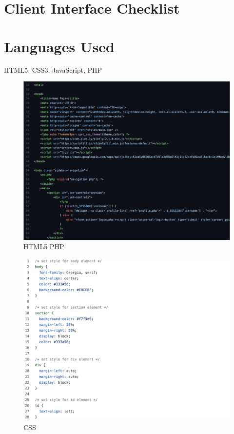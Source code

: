 \documentclass[12pt, letterpaper]{article}
\begin{document}
\newpage

\tableofcontents

\newpage

\section*{Client Interface Checklist}

\section{Languages Used}
HTML5, CSS3, JavaScript, PHP

\begin{figure}[htbp]
	\centering
	\includegraphics[width=5in]{images/q1_1.jpg}
	\caption{HTML5 PHP}
 \end{figure}
 
 \begin{figure}[htbp]
	\centering
	\includegraphics[width=5in]{images/q1_2.png}
	\caption{CSS}
 \end{figure}
 
\end{document}
